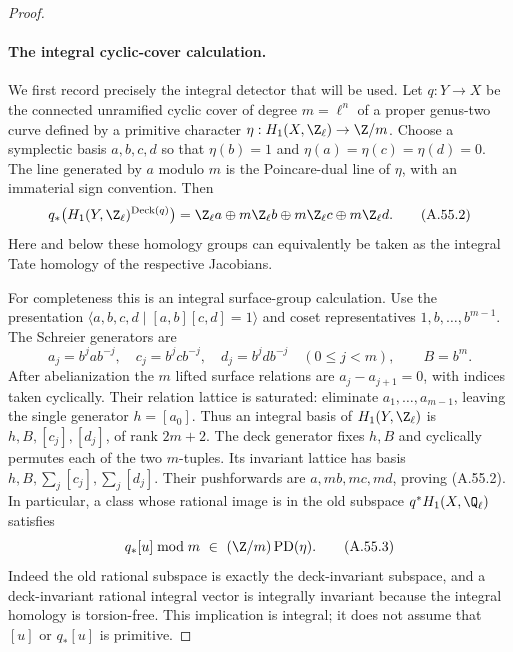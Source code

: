 \begin{proof}
\paragraph{The integral cyclic-cover calculation.}
We first record precisely the integral detector that will be used.
Let \(q:Y\to X\) be the connected unramified cyclic cover of
degree \(m=\ell^n\) of a proper genus-two curve defined by a
primitive character
\(\eta:H_1(X,\Z_\ell)\to\Z/m\).
Choose a symplectic basis \(a,b,c,d\) so that
\(\eta(b)=1\) and \(\eta(a)=\eta(c)=\eta(d)=0\).
The line generated by \(a\) modulo \(m\) is the Poincare-dual
line of \(\eta\), with an immaterial sign convention.
Then
\[
 q_*\bigl(H_1(Y,\Z_\ell)^{\operatorname{Deck}(q)}\bigr)
   =\Z_\ell a\oplus m\Z_\ell b
       \oplus m\Z_\ell c\oplus m\Z_\ell d.             \tag{A.55.2}
\]
Here and below these homology groups can equivalently be taken as
the integral Tate homology of the respective Jacobians.

For completeness this is an integral surface-group calculation.
Use the presentation
\(\langle a,b,c,d\mid[a,b][c,d]=1\rangle\) and
coset representatives \(1,b,\ldots,b^{m-1}\).
The Schreier generators are
\[
 a_j=b^jab^{-j},\quad c_j=b^jcb^{-j},\quad
 d_j=b^jdb^{-j}\quad(0\le j<m),\qquad B=b^m.
\]
After abelianization the \(m\) lifted surface relations are
\(a_j-a_{j+1}=0\), with indices taken cyclically. Their relation
lattice is saturated: eliminate \(a_1,\ldots,a_{m-1}\), leaving
the single generator \(h=[a_0]\). Thus an integral basis of
\(H_1(Y,\Z_\ell)\) is
\(h,B,[c_j],[d_j]\), of rank \(2m+2\).
The deck generator fixes \(h,B\) and cyclically permutes each
of the two \(m\)-tuples. Its invariant lattice has basis
\(h,B,\sum_j[c_j],\sum_j[d_j]\). Their pushforwards are
\(a,mb,mc,md\), proving (A.55.2).
In particular, a class whose rational image is in the old subspace
\(q^*H_1(X,\Q_\ell)\) satisfies
\[
      q_*[u]\bmod m\ \in\ (\Z/m)\operatorname{PD}(\eta).
                                                        \tag{A.55.3}
\]
Indeed the old rational subspace is exactly the deck-invariant
subspace, and a deck-invariant rational integral vector is
integrally invariant because the integral homology is torsion-free.
This implication is integral; it does not assume that \([u]\) or
\(q_*[u]\) is primitive.


\end{proof}
